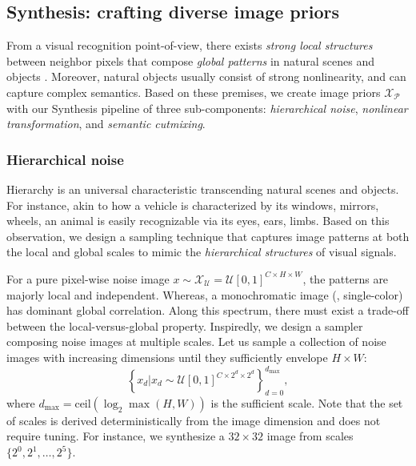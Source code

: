 \subsection{Synthesis: crafting diverse image priors} \label{ssec:03-framework-synthesis}
\begin{foldable} %
    From a visual recognition point-of-view, there exists \textit{strong local structures} between neighbor pixels that compose \textit{global patterns} in natural scenes and objects \citep{lecun2002gradient}.
    Moreover, natural objects usually consist of strong nonlinearity, and can capture complex semantics.
    Based on these premises, we create image priors $\mathcal{X}_\mathcal{P}$ with our Synthesis pipeline of three sub-components: \textit{hierarchical noise}, \textit{nonlinear transformation}, and \textit{semantic cutmixing}.
\end{foldable}


\subsubsection{Hierarchical noise} \label{sssec:03-framework-synthesis-hiernoise}
\begin{foldable} %
    Hierarchy is an universal characteristic transcending natural scenes and objects.
    For instance, akin to how a vehicle is characterized by its windows, mirrors, wheels, an animal is easily recognizable via its eyes, ears, limbs.
    Based on this observation, we design a sampling technique that captures image patterns at both the local and global scales to mimic the \textit{hierarchical structures} of  visual signals.
\end{foldable}

\begin{foldable} %
    For a pure pixel-wise noise image $x\sim\mathcal{X_{\mathcal{U}}} = \mathcal{U}\left[0,1\right]^{C\times H\times W}$, the patterns are majorly local and independent.
    Whereas, a monochromatic image (\ie, single-color) has dominant global correlation.
    Along this spectrum, there must exist a trade-off between the local-versus-global property.
    Inspiredly, we design a sampler composing noise images at multiple scales.
    Let us sample a collection of noise images with increasing dimensions until they sufficiently envelope $H\times W$:
    \begin{equation} \label{eq:synthesis-hiernoise-multiscale}
        \left\{ x_{d}|x_{d}\sim\mathcal{U}\left[0,1\right]^{C\times2^{d}\times2^{d}}\right\} _{d=0}^{d_{\text{max}}},
    \end{equation}
    where $d_{\text{max}}=\text{ceil}\left(\log_{2}\max\left(H,W\right)\right)$ is the sufficient scale.
    Note that the set of scales is derived deterministically from the image dimension and does not require tuning.
    For instance, we synthesize a $32 \times 32$ image from scales $\{2^0, 2^1, \ldots, 2^5\}$. 
\end{foldable}

